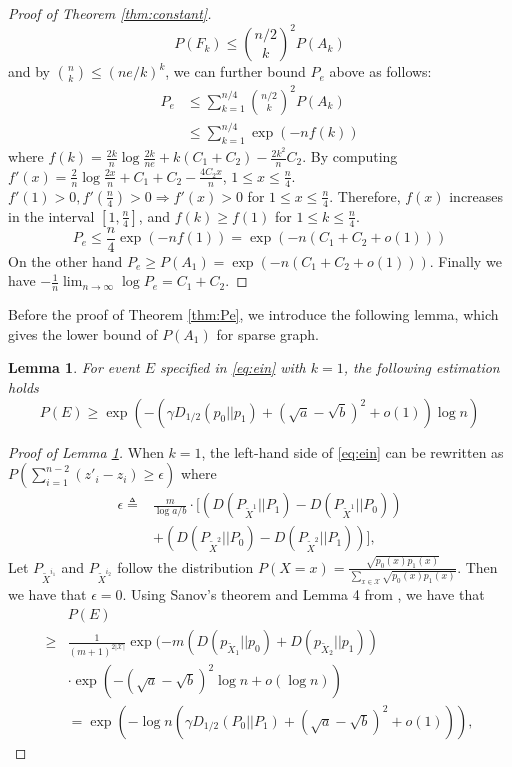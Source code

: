 \documentclass[conference]{IEEEtran}
\newtheorem{lemma}{Lemma}
\begin{document}
\begin{proof}[Proof of Theorem \ref{thm:constant}]
\begin{equation}
P(F_k) \leq \binom{n/2}{k}^2 P(A_k)
\end{equation}
and by $\binom{n}{k} \leq (ne/k)^k$, we can further bound $P_e$ above as follows:
\begin{align*}
P_e & \leq \sum_{k=1}^{n/4} \binom{n/2}{k}^2 P(A_k) \\
& \leq \sum_{k=1}^{n/4} \exp(-nf(k))
\end{align*}
where $f(k) = \frac{2k}{n}\log \frac{2k}{ne} + k(C_1+C_2) - \frac{2k^2}{n}C_2$.
By computing $f'(x)= \frac{2}{n} \log \frac{2x}{n} + C_1+C_2 - \frac{4C_2x}{n}$, $1\leq x \leq \frac{n}{4}$.
$f'(1) > 0 , f'(\frac{n}{4}) > 0 \Rightarrow f'(x) > 0$ for $1\leq x \leq \frac{n}{4}$.
Therefore, $f(x)$ increases in the interval $[1, \frac{n}{4}]$, and $f(k) \geq f(1)$ for $1\leq k \leq \frac{n}{4}$.
\begin{equation}
P_e \leq \frac{n}{4}\exp(-nf(1)) = \exp(-n (C_1+C_2+o(1)))
\end{equation}
On the other hand $P_e \geq P(A_1) = \exp(-n(C_1+C_2+o(1)))$.
Finally we have $-\frac{1}{n} \lim_{n \to \infty} \log P_e = C_1+C_2$.
\end{proof}
Before the proof of Theorem \ref{thm:Pe}, we introduce the following lemma, which gives the lower bound
of $P(A_1)$ for sparse graph.
\begin{lemma}\label{lem:single_lower}
For event $E$ specified in \eqref{eq:ein} with $k=1$, the following estimation holds
\begin{equation}
P(E) \geq \exp(-(\gamma D_{1/2}(p_0||p_1) + (\sqrt{a}-\sqrt{b})^2 + o(1))\log n )
\end{equation}
\end{lemma}
\begin{proof}[Proof of Lemma \ref{lem:single_lower}] 
	When $k=1$, the left-hand side of \eqref{eq:ein} can be rewritten as $P(\sum_{i=1}^{n-2} (z'_i - z_i) \geq \epsilon)$
	where
	\begin{align*}
	\epsilon\triangleq&\frac{m}{\log a/b}\cdot [(D(P_{\widetilde{X}^{1}} || P_1) - D(P_{\widetilde{X}^{1}} || P_0)) \\
	&+(D(P_{\widetilde{X}^{2}} || P_0) - D(P_{\widetilde{X}^{2}} || P_1))],
	\end{align*}
	Let $P_{\widetilde{X}^{i_1}}$ and $P_{\widetilde{X}^{i_2}}$ follow the distribution
	$P(X=x)=\frac{\sqrt{p_0(x)p_1(x)}}{ \sum_{x\in \mathcal{X}} \sqrt{p_0(x) p_1(x)}} $.
	Then we have that $\epsilon =0$. Using Sanov's theorem and Lemma 4 from \cite{abbe2015exact}, we have that
	\begin{align*}
	&P(E)\\
	\geq &\frac{1}{(m+1)^{2|\mathcal{X}|}} \exp(-m(D(p_{\widetilde{X}_1} || p_0) + D(p_{\widetilde{X}_2} || p_1)) \\
	&\cdot\exp(- (\sqrt{a} - \sqrt{b})^2\log n+o(\log n) ) \\
	& = \exp(-\log n (\gamma D_{1/2}(P_0||P_1) + (\sqrt{a} - \sqrt{b})^2+ o(1))),
	\end{align*}
\end{proof}
\end{document}
